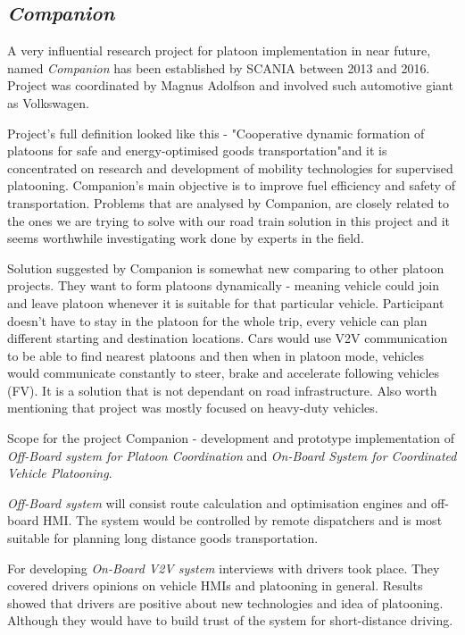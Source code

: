 \subsection{\textit{Companion}}\label{sec:Companion}
% 
A very influential research project for platoon implementation in near future, named \emph{Companion} \cite{2016CompanionProject} has been established by SCANIA between 2013 and 2016. Project was coordinated by Magnus Adolfson and involved such automotive giant as Volkswagen.\par
% 
Project's full definition looked like this - "Cooperative dynamic formation of platoons for safe and energy-optimised goods transportation"\footnotemark and it is concentrated on research and development of mobility technologies for supervised platooning. Companion's main objective is to improve fuel efficiency and safety of transportation.%
% 
%
% 
Problems that are analysed by Companion, are closely related to the ones we are trying to solve with our road train solution in this project and it seems worthwhile investigating work done by experts in the field\footnotemark.\par
% 
% 
Solution suggested by Companion is somewhat new comparing to other platoon projects. They want to form platoons dynamically - meaning vehicle could join and leave platoon whenever it is suitable for that particular vehicle. Participant doesn't have to stay in the platoon for the whole trip, every vehicle can plan different starting and destination locations. Cars would use V2V communication to be able to find nearest platoons and then when in platoon mode, vehicles would communicate constantly to steer, brake and accelerate following vehicles (FV). It is a solution that is not dependant on road infrastructure. Also worth mentioning that project was mostly focused on heavy-duty vehicles.\par
% 
Scope for the project Companion - development and prototype implementation of \emph{Off-Board system for Platoon Coordination} and \emph{On-Board System for Coordinated Vehicle Platooning}.\par
% 
\emph{Off-Board system} will consist route calculation and optimisation engines and off-board HMI. The system would be controlled by remote dispatchers and is most suitable for planning long distance goods transportation.\par
% 
For developing \emph{On-Board V2V system} interviews with drivers took place. They covered drivers opinions on vehicle HMIs and platooning in general. Results showed that drivers are positive about new technologies and idea of platooning. Although they would have to build trust of the system for short-distance driving.\par
